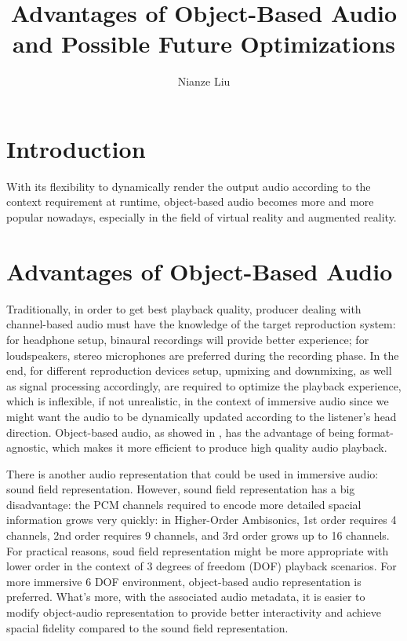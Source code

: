 \documentclass[jou]{apa6}
\title{Advantages of Object-Based Audio and Possible Future Optimizations}
\author{Nianze Liu}
\affiliation{New York University}
\begin{document}
\maketitle

\section{Introduction}

With its flexibility to dynamically render the output audio according to the context requirement at runtime, object-based audio becomes more and more popular nowadays, especially in the field of virtual reality and augmented reality. 

\section{Advantages of Object-Based Audio}

Traditionally, in order to get best playback quality, producer dealing with channel-based audio must have the knowledge of the target reproduction system: for headphone setup, binaural recordings will provide better experience; for loudspeakers, stereo microphones are preferred during the recording phase. In the end, for different reproduction devices setup, upmixing and downmixing, as well as signal processing accordingly, are required to optimize the playback experience, which is inflexible, if not unrealistic, in the context of immersive audio since we might want the audio to be dynamically updated according to the listener's head direction. Object-based audio, as showed in \textcite{susal2016immersive}, has the advantage of being format-agnostic, which makes it more efficient to produce high quality audio playback.

There is another audio representation that could be used in immersive audio: sound field representation. However, sound field representation has a big disadvantage: the PCM channels required to encode more detailed spacial information grows very quickly: in Higher-Order Ambisonics, 1st order requires 4 channels, 2nd order requires 9 channels, and 3rd order grows up to 16 channels. For practical reasons, soud field representation might be more appropriate with lower order in the context of 3 degrees of freedom (DOF) playback scenarios. For more immersive 6 DOF environment, object-based audio representation is preferred. What's more, with the associated audio metadata, it is easier to modify object-audio representation to provide better interactivity and achieve spacial fidelity compared to the sound field representation.
\end{document}
